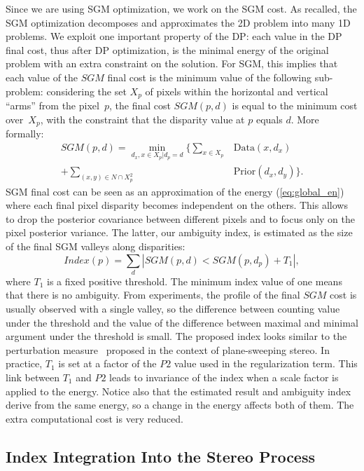 \documentclass{article}
\begin{document}
Since we are using SGM optimization, we work on the SGM cost. As recalled, the SGM optimization decomposes and approximates the 2D problem into many 1D problems. We exploit one important property of the DP: each value in the DP final cost, thus after DP optimization, is the minimal energy of the original problem with an extra constraint on the solution. For SGM, this implies that each value of the $SGM$ final cost is the minimum value of the following sub-problem: considering the set $X_p$ of pixels within the horizontal and vertical ``arms'' from the pixel~$p$, the final cost $SGM(p,d)$ is equal to the minimum cost over~$X_p$, with the constraint that the disparity value at $p$ equals $d$. More formally:
\begin{equation}
\begin{split}
  SGM(p,d) = \min_{d_x, x \in X_p | d_p = d} \{  \sum_{x \in X_p}  &\text{Data}(x,d_x) \\
  + \sum_{(x,y) \in N\cap X_p^2} &\text{Prior}(d_x,d_y) \}.
\end{split}
\end{equation}
SGM final cost can be seen as an approximation of the energy (\ref{eq:global_en}) where each final pixel disparity becomes independent on the others. This allows to drop the posterior covariance between different pixels and to focus only on the pixel posterior variance. The latter, our ambiguity index, is estimated as the size of the final SGM valleys along disparities:
\begin{equation}
Index(p) = \sum_{d}{|SGM(p,d) < SGM(p,d_p) + T_1|},
\end{equation}
where $T_1$ is a fixed positive threshold. The minimum index value of one means that there is no ambiguity. From experiments, the profile of the final $SGM$ cost is usually observed with a single valley, so the difference between counting value under the threshold and the value of the difference between maximal and minimal argument under the threshold is small. The proposed index looks similar to the perturbation measure~\cite{merrell07} proposed in the context of plane-sweeping stereo. In practice, $T_1$ is set at a factor of the $P2$ value used in the regularization term. This link between $T_1$ and $P2$ leads to invariance of the index when a scale factor is applied to the energy. Notice also that the estimated result and ambiguity index derive from the same energy, so a change in the energy affects both of them. The extra computational cost is very reduced.


\subsection{Index Integration Into the Stereo Process}
\label{ss:in_proc}
\end{document}
